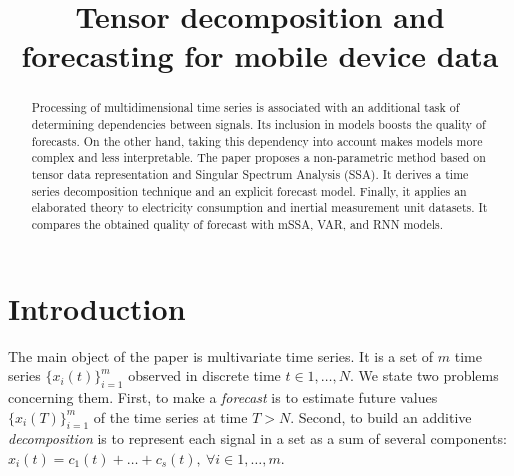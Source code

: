 \documentclass[referee, pdflatex, sn-mathphys-num]{sn-jnl}
\theoremstyle{definition}
\theoremstyle{plain}
\begin{document}
	
	\title{Tensor decomposition and forecasting for mobile device data}
	
	\author*[1]{ }
	\author*[2]{ }
	
	
	
	\maketitle
	
	\begin{abstract}
		
		Processing of multidimensional time series is associated with an additional task of determining dependencies between signals. Its inclusion in models boosts the quality of forecasts. On the other hand, taking this dependency into account makes models more complex and less interpretable. The paper proposes a non-parametric method based on tensor data representation and Singular Spectrum Analysis (SSA). It derives a time series decomposition technique and an explicit forecast model. Finally, it applies an elaborated theory to electricity consumption and inertial measurement unit datasets. It compares the obtained quality of forecast with mSSA, VAR, and RNN models.
		
	\end{abstract}
	
	\section{Introduction}\label{Intro}
	
	The main object of the paper is multivariate time series. It is a set of $ m $ time series $ \{x_i(t)\}_{i=1}^m $ observed in discrete time $ t \in 1 , \ldots , N $.	We state two problems concerning them. First, to make a \emph{forecast} is to estimate future values $ \{x_i(T)\}_{i=1}^m $ of the time series at time $ T > N $. Second, to build an additive \emph{decomposition} is to represent each signal in a set as a sum of several components: $ x_i(t) = c_1(t) + \ldots + c_s(t), \ \forall i \in 1, \ldots , m $.
	
\end{document}
